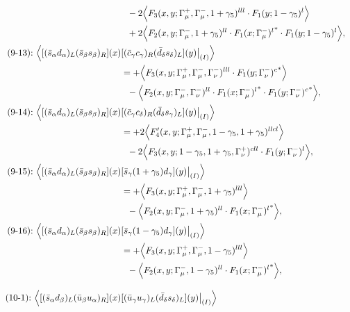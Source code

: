 \begin{align}
\notag\\*&\ \ 
-2\Big\langle F_3(x,y;\Gamma_\mu^+,\Gamma_\mu^-,1+\gamma_5)^{lll} \cdot F_1(y;1-\gamma_5)^l\Big\rangle
\notag\\*&\ \ 
 + 2\Big\langle F_2(x,y;\Gamma_\mu^-,1+\gamma_5)^{ll} \cdot {F_1(x;\Gamma_\mu^-)^l}^* \cdot F_1(y;1-\gamma_5)^l\Big\rangle,
\\
\mbox{(9-13):}\ 
\Big\langle
[(\bar s_\alpha d_\alpha)_L(\bar s_\beta s_\beta)_R](x)&
[(\bar c_\gamma c_\gamma)_R(\bar d_\delta s_\delta)_L](y)\big|_{(I)}
\Big\rangle
\notag\\*
&=
 + \Big\langle F_3(x,y;\Gamma_\mu^+,\Gamma_\mu^-,\Gamma_\nu^-)^{lll} \cdot {F_1(y;\Gamma_\nu^-)^c}^*\Big\rangle
\notag\\*&\ \ 
 - \Big\langle F_2(x,y;\Gamma_\mu^-,\Gamma_\nu^-)^{ll} \cdot {F_1(x;\Gamma_\mu^-)^l}^* \cdot {F_1(y;\Gamma_\nu^-)^c}^*\Big\rangle,
\\
\mbox{(9-14):}\ 
\Big\langle
[(\bar s_\alpha d_\alpha)_L(\bar s_\beta s_\beta)_R](x)&
[(\bar c_\gamma c_\delta)_R(\bar d_\delta s_\gamma)_L](y)\big|_{(I)}
\Big\rangle
\notag\\*
&=
 + 2\Big\langle F_4'(x,y;\Gamma_\mu^+,\Gamma_\mu^-,1-\gamma_5,1+\gamma_5)^{llcl}\Big\rangle
\notag\\*&\ \ 
-2\Big\langle F_3(x,y;1-\gamma_5,1+\gamma_5,\Gamma_\nu^+)^{cll} \cdot F_1(y;\Gamma_\nu^-)^l\Big\rangle,
\\
\mbox{(9-15):}\ 
\Big\langle
[(\bar s_\alpha d_\alpha)_L(\bar s_\beta s_\beta)_R](x)&
[\bar s_\gamma (1 + \gamma_5) d_\gamma](y)\big|_{(I)}
\Big\rangle
\notag\\*
&=
 + \Big\langle F_3(x,y;\Gamma_\mu^+,\Gamma_\mu^-,1+\gamma_5)^{lll}\Big\rangle
\notag\\*&\ \ 
 - \Big\langle F_2(x,y;\Gamma_\mu^-,1+\gamma_5)^{ll} \cdot {F_1(x;\Gamma_\mu^-)^l}^*\Big\rangle,
\\
\mbox{(9-16):}\ 
\Big\langle
[(\bar s_\alpha d_\alpha)_L(\bar s_\beta s_\beta)_R](x)&
[\bar s_\gamma (1 - \gamma_5) d_\gamma](y)\big|_{(I)}
\Big\rangle
\notag\\*
&=
 + \Big\langle F_3(x,y;\Gamma_\mu^+,\Gamma_\mu^-,1-\gamma_5)^{lll}\Big\rangle
\notag\\*&\ \ 
 - \Big\langle F_2(x,y;\Gamma_\mu^-,1-\gamma_5)^{ll} \cdot {F_1(x;\Gamma_\mu^-)^l}^*\Big\rangle,
\\[3mm]
\mbox{(10-1):}\ 
\Big\langle
[(\bar s_\alpha d_\beta)_L(\bar u_\beta u_\alpha)_R](x)&
[(\bar u_\gamma u_\gamma)_L(\bar d_\delta s_\delta)_L](y)\big|_{(I)}
\Big\rangle
\notag\\*

\end{align}
